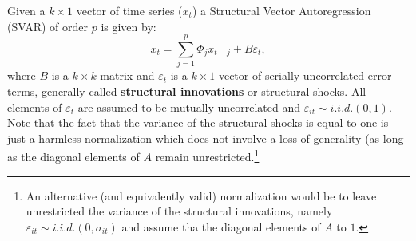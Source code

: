 \documentclass[10pt]{article}
\begin{document}
Given a $k\times 1$ vector of time series ($x_{t}$) a Structural Vector
Autoregression (SVAR) of order $p$ is given by:%
\begin{equation}
x_{t}=\sum_{j=1}^{p}\Phi _{j}x_{t-j}+B\varepsilon _{t},
\label{eq:struct_var_0}
\end{equation}%
where $B$ is a $k\times k$ matrix and $\varepsilon _{t}$ is a $k\times 1$
vector of serially uncorrelated error terms, generally called \textbf{%
structural innovations} or structural shocks. All elements of $\varepsilon
_{t}$ are assumed to be mutually uncorrelated and $\varepsilon _{it}\sim
i.i.d.(0,1)$. Note that the fact that the variance of the structural shocks
is equal to one is just a harmless normalization which does not involve a
loss of generality (as long as the diagonal elements of $A$ remain
unrestricted.\footnote{%
An alternative (and equivalently valid) normalization would be to leave
unrestricted the variance of the structural innovations, namely $\varepsilon
_{it}\sim i.i.d.(0,\sigma _{it})$ and assume tha the diagonal elements of $A$
to $1$.}
\end{document}
